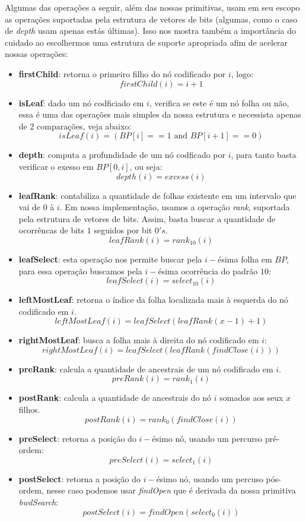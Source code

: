     Algumas das operações a seguir, além das nossas primitivas, usam em seu escopo as operações suportadas pela estrutura de vetores de bits 
    (algumas, como o caso de \textit{depth} usam apenas estás últimas). Isso nos
    mostra também a importância do cuidado ao escolhermos uma estrutura de suporte apropriada afim de acelerar nossas operações:
        \begin{itemize}
            \item \textbf{firstChild}: retorna o primeiro filho do nó codificado por $i$, logo:
            $$firstChild(i) = i +1$$
            \item \textbf{isLeaf}: dado um nó codficiado em $i$, verifica se este é um nó folha ou não, essa é uma das operações mais simples da nossa estrutura e necessista apenas de 2 comparações, veja abaixo:
            $$isLeaf(i) = (BP[i] == 1 \mbox{ and } BP[i+1]==0)$$
            \item \textbf{depth}: computa a profundidade de um nó codficado por $i$, para tanto basta verificar o exesso em $BP[0,i]$, ou seja:
            $$depth(i) = excess(i)$$
            \item \textbf{leafRank}: contabiliza a quantidade de folhas existente em um intervalo que vai de $0$ à $i$. Em nossa implementação, usamos a operação \textit{rank},
            suportada pela estrutura de vetores de bits. Assim, basta buscar a quantidade de ocorrêncas de bits $1$ seguidos por bit $0's$.
            $$leafRank(i) = rank_{10}(i)$$
            \item \textbf{leafSelect}: esta operação nos permite buscar pela $i-$ésima folha em $BP$, para essa operação buscamos pela $i-$ésima ocorrência do padrão $10$:
            $$leafSelect(i) = select_{10}(i)$$
            \item \textbf{leftMostLeaf}: retorna o índice da folha localizada mais à esquerda do nó codificado em $i$.
            $$leftMostLeaf(i) = leafSelect(leafRank(x-1)+1)$$
            \item  \textbf{rightMostLeaf}: busca a folha mais à direita do nó codificado em $i$:
            $$rightMostLeaf(i) = leafSelect(leafRank(findClose(i)))$$
            \item \textbf{preRank}: calcula a quantidade de ancestrais de um nó codificado em $i$.
            $$preRank(i) = rank_1(i)$$
            \item \textbf{postRank}: calcula a quantidade de ancestrais do nó $i$  somados aos seux $x$ filhos.
            $$postRank(i) = rank_0(findClose(i))$$
            \item \textbf{preSelect}: retorna a posição do $i-$ésimo nó, usando um percurso pré-ordem:
            $$preSelect(i) = select_1(i)$$
            \item \textbf{postSelect}: retorna a posição do $i-$ésimo nó, usando um percuso pós-ordem, nesse caso podemos usar \textit{findOpen} que é derivada da nossa primitiva \textit{bwdSearch}:
            $$postSelect(i) = findOpen(select_0(i))$$
        \end{itemize} 

